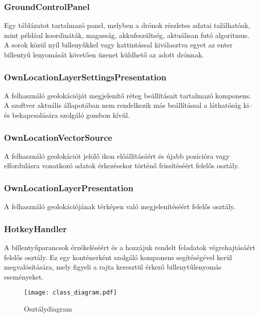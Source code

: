 \subsubsection{GroundControlPanel}

Egy táblázatot tartalmazó panel, melyben a drónok részletes adatai találhatóak,
mint például koordináták, magasság, akkufeszültség, aktuálisan futó algoritmus.
A sorok közül nyíl billenyűkkel vagy kattintással kiválasztva egyet az enter
billentyű lenyomását követően üzenet küldhető az adott drónnak.

\subsubsection{OwnLocationLayerSettingsPresentation}

A felhasználó geolokációját megjelenítő réteg beállításait tartalmazó komponens.
A szoftver aktuális állapotában nem rendelkezik más beállítással a láthatóság
ki-- és bekapcsolására szolgáló gombon kívül.

\subsubsection{OwnLocationVectorSource}

A felhasználó geolokációt jelölő ikon előállításáért és újabb pozícióra vagy
elfordulásra vonatkozó adatok érkezésekor történő frissítéséért felelős osztály.

\subsubsection{OwnLocationLayerPresentation}

A felhasználó geolokációjának térképen való megjelenítéséért felelős osztály.

\subsubsection{HotkeyHandler}

A billentyűparancsok érzékeléséért és a hozzájuk rendelt feladatok
végrehajtásáért felelős osztály. Ez egy konténerként szolgáló komponens
segítéségével kerül megvalósítására, mely figyeli a rajta keresztül érkező
billenytűlenyomás eseményeket.

\begin{figure}[H]
  \centering
    \texttt{[image: class\_diagram.pdf]}
  \caption{Osztálydiagram}
\end{figure}
